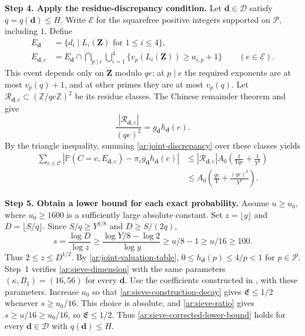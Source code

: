 \documentclass[twoside]{aomart}
\makeatletter
\theoremstyle{paperplain}
\theoremstyle{paperdefinition}
\renewenvironment{proof}[1][\proofname]{\par\pushQED{\qed}%
  \normalfont\topsep6\p@\@plus3\p@\relax\trivlist
  \item[\hskip\labelsep\itshape #1\@addpunct{.}]\ignorespaces
}{\popQED\endtrivlist\@endpefalse}
\newcommand{\Z}{\mathbb Z}
\newcommand{\Pp}{\mathbb P}
\numberwithin{equation}{section}
\makeatother
\begin{document}
\begin{proof}
\par
\medskip
\noindent\textbf{Step 4. Apply the residue-discrepancy condition.}
Let $\mathbf d\in\mathscr D$ satisfy $q=q(\mathbf d)\le H$.
Write $\mathcal E$ for the squarefree positive integers supported
on $\mathcal P$, including $1$. Define
\begin{equation*}
 \begin{aligned}
 E_{\mathbf d}&=\{d_i\mid L_i(\mathbf Z)\text{ for }1\le i\le4\},\\
 E_{\mathbf d,e}&=E_{\mathbf d}\cap
 \bigcap_{p\mid e}\bigcup_{i=1}^4
 \{v_p(L_i(\mathbf Z))\ge a_{i,p}+1\}\qquad(e\in\mathcal E).
 \end{aligned}
 \end{equation*}
This event depends only on $\mathbf Z$ modulo $qe$:
at $p\mid e$ the required exponents are at most $v_p(q)+1$,
and at other primes they are at most $v_p(q)$.
Let $\mathcal R_{\mathbf d,e}\subset(\Z/qe\Z)^2$ be its residue classes.
The Chinese remainder theorem and  give
\begin{equation*}
 \frac{|\mathcal R_{\mathbf d,e}|}{(qe)^2}
 =g_{\mathbf d}h_{\mathbf d}(e).
 \end{equation*}
By the triangle inequality, summing \eqref{ar:joint-discrepancy}
over these classes yields
\begin{equation}
 \begin{aligned}
 \sum_{c\in\mathcal C}\left|\Pp(C=c,E_{\mathbf d,e})
       -\pi_cg_{\mathbf d}h_{\mathbf d}(e)\right|
 &\le |\mathcal R_{\mathbf d,e}|A_0
       \left(\frac1{Yqe}+\frac1{Y^2}\right)\\
 &\le A_0\left(\frac{qe}{Y}+\frac{(qe)^2}{Y^2}\right).
 \end{aligned}
 \label{ar:surplus-discrepancy}
\end{equation}

\par
\medskip
\noindent\textbf{Step 5. Obtain a lower bound for each exact probability.}
Assume $u\ge u_0$, where $u_0\ge1600$ is a sufficiently large
absolute constant. Set $z=\lfloor y\rfloor$ and $D=\lfloor S/q\rfloor$.
Since $S/q\ge Y^{1/8}$ and $D\ge S/(2q)$,
\begin{equation}
 s=\frac{\log D}{\log z}
 \ge\frac{\log Y/8-\log2}{\log y}
 \ge u/8-1\ge u/16\ge100.
 \label{ar:sieve-ratio}
\end{equation}
Thus $2\le z\le D^{1/2}$. By \eqref{ar:joint-valuation-table},
$0\le h_{\mathbf d}(p)\le4/p<1$ for $p\in\mathcal P$.
Step~1 verifies \eqref{ar:sieve-dimension} with the same
parameters $(\kappa,B_1)=(16,56)$ for every $\mathbf d$.
Use the coefficients constructed in
\cite[Theorem~3.6(a), pp.~38--39]{FordSieve2023}, with these parameters.
Increase $u_0$ so that \eqref{ar:sieve-construction-decay} gives
$\mathfrak E\le1/2$ whenever $s\ge u_0/16$.
This choice is absolute, and \eqref{ar:sieve-ratio} gives
$s\ge u/16\ge u_0/16$, so $\mathfrak E\le1/2$.
Thus \eqref{ar:sieve-corrected-lower-bound} holds for every
$\mathbf d\in\mathscr D$ with $q(\mathbf d)\le H$.


\end{proof}
\end{document}

